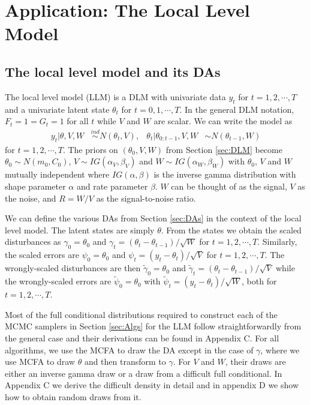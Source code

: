\documentclass[12pt]{article}
\begin{document}
\section{Application: The Local Level Model}\label{sec:LLM}

\subsection{The local level model and its DAs}

The local level model (LLM) is a DLM with univariate data $y_t$ for $t=1,2,\cdots,T$ and a univariate latent state $\theta_t$ for $t=0,1,\cdots,T$. In the general DLM notation, $F_t=1=G_t=1$ for all $t$ while $V$ and $W$ are scalar. We can write the model as
\begin{align*}
  y_t |\theta,V,W& \stackrel{ind}{\sim} N(\theta_t,V), &
  \theta_t |\theta_{0:t-1},V,W& \sim N(\theta_{t-1},W)
\end{align*}
for $t=1,2,\cdots,T$. The priors on $(\theta_0,V,W)$ from Section \ref{sec:DLM} become $\theta_0\sim N(m_0,C_0)$, $V\sim IG(\alpha_V,\beta_V)$ and $W\sim IG(\alpha_W,\beta_W)$ with $\theta_0$, $V$ and $W$ mutually independent where $IG(\alpha,\beta)$ is the inverse gamma distribution with shape parameter $\alpha$ and rate parameter $\beta$. $W$ can be thought of as the signal, $V$ as the noise, and $R=W/V$ as the signal-to-noise ratio.

We can define the various DAs from Section \ref{sec:DAs} in the context of the local level model. The latent states are simply $\theta$. From the states we obtain the scaled disturbances as $\gamma_0=\theta_0$ and $\gamma_t = (\theta_t - \theta_{t-1})/\sqrt{W}$ for $t=1,2,\cdots,T$. Similarly, the scaled errors are $\psi_0=\theta_0$ and $\psi_t = (y_t - \theta_t)/\sqrt{V}$ for $t=1,2,\cdots,T$. The wrongly-scaled disturbances are then $\tilde{\gamma}_{0}=\theta_0$ and $\tilde{\gamma}_t = (\theta_t - \theta_{t-1})/\sqrt{V}$ while the wrongly-scaled errors are $\tilde{\psi}_0=\theta_0$ with $\tilde{\psi}_t = (y_t - \theta_t)/\sqrt{W}$, both for $t=1,2,\cdots,T$. 

Most of the full conditional distributions required to construct each of the MCMC samplers in Section \ref{sec:Algs} for the LLM follow straightforwardly from the general case and their derivations can be found in Appendix C. For all algorithms, we use the MCFA to draw the DA except in the case of $\gamma$, where we use MCFA to draw $\theta$ and then transform to $\gamma$. For $V$ and $W$, their draws are either an inverse gamma draw or a draw from a difficult full conditional. In Appendix C we derive the difficult density in detail and in appendix D we show how to obtain random draws from it.
\end{document}
